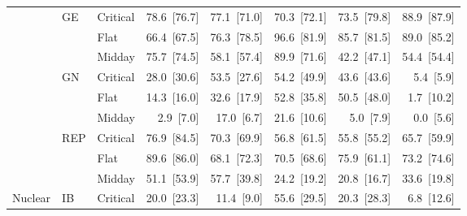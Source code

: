 \begin{tabular}{l l l r r r r r}
 & GE & Critical & 78.6~{\color{seasoncol}\scriptsize[76.7]} & 77.1~{\color{seasoncol}\scriptsize[71.0]} & 70.3~{\color{seasoncol}\scriptsize[72.1]} & 73.5~{\color{seasoncol}\scriptsize[79.8]} & 88.9~{\color{seasoncol}\scriptsize[87.9]} \\
 &  & Flat & 66.4~{\color{seasoncol}\scriptsize[67.5]} & 76.3~{\color{seasoncol}\scriptsize[78.5]} & 96.6~{\color{seasoncol}\scriptsize[81.9]} & 85.7~{\color{seasoncol}\scriptsize[81.5]} & 89.0~{\color{seasoncol}\scriptsize[85.2]} \\
 &  & Midday & 75.7~{\color{seasoncol}\scriptsize[74.5]} & 58.1~{\color{seasoncol}\scriptsize[57.4]} & 89.9~{\color{seasoncol}\scriptsize[71.6]} & 42.2~{\color{seasoncol}\scriptsize[47.1]} & 54.4~{\color{seasoncol}\scriptsize[54.4]} \\
 & GN & Critical & 28.0~{\color{seasoncol}\scriptsize[30.6]} & 53.5~{\color{seasoncol}\scriptsize[27.6]} & 54.2~{\color{seasoncol}\scriptsize[49.9]} & 43.6~{\color{seasoncol}\scriptsize[43.6]} & 5.4~{\color{seasoncol}\scriptsize[5.9]} \\
 &  & Flat & 14.3~{\color{seasoncol}\scriptsize[16.0]} & 32.6~{\color{seasoncol}\scriptsize[17.9]} & 52.8~{\color{seasoncol}\scriptsize[35.8]} & 50.5~{\color{seasoncol}\scriptsize[48.0]} & 1.7~{\color{seasoncol}\scriptsize[10.2]} \\
 &  & Midday & 2.9~{\color{seasoncol}\scriptsize[7.0]} & 17.0~{\color{seasoncol}\scriptsize[6.7]} & 21.6~{\color{seasoncol}\scriptsize[10.6]} & 5.0~{\color{seasoncol}\scriptsize[7.9]} & 0.0~{\color{seasoncol}\scriptsize[5.6]} \\
 & REP & Critical & 76.9~{\color{seasoncol}\scriptsize[84.5]} & 70.3~{\color{seasoncol}\scriptsize[69.9]} & 56.8~{\color{seasoncol}\scriptsize[61.5]} & 55.8~{\color{seasoncol}\scriptsize[55.2]} & 65.7~{\color{seasoncol}\scriptsize[59.9]} \\
 &  & Flat & 89.6~{\color{seasoncol}\scriptsize[86.0]} & 68.1~{\color{seasoncol}\scriptsize[72.3]} & 70.5~{\color{seasoncol}\scriptsize[68.6]} & 75.9~{\color{seasoncol}\scriptsize[61.1]} & 73.2~{\color{seasoncol}\scriptsize[74.6]} \\
 &  & Midday & 51.1~{\color{seasoncol}\scriptsize[53.9]} & 57.7~{\color{seasoncol}\scriptsize[39.8]} & 24.2~{\color{seasoncol}\scriptsize[19.2]} & 20.8~{\color{seasoncol}\scriptsize[16.7]} & 33.6~{\color{seasoncol}\scriptsize[19.8]} \\
\addlinespace
Nuclear & IB & Critical & 20.0~{\color{seasoncol}\scriptsize[23.3]} & 11.4~{\color{seasoncol}\scriptsize[9.0]} & 55.6~{\color{seasoncol}\scriptsize[29.5]} & 20.3~{\color{seasoncol}\scriptsize[28.3]} & 6.8~{\color{seasoncol}\scriptsize[12.6]} \\

\end{tabular}
